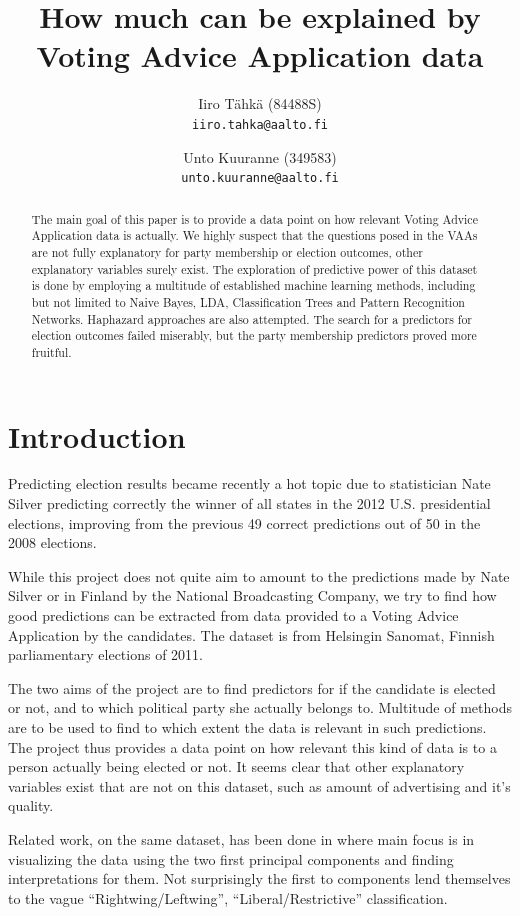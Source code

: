 \documentclass[a4paper,10pt]{article}
\title{How much can be explained by Voting Advice Application data}
\author{
        Iiro Tähkä (84488S)\\ 
       {\tt \small iiro.tahka@aalto.fi}
        \and          
        Unto Kuuranne (349583)\\ 
       {\tt \small unto.kuuranne@aalto.fi}
}
\begin{document}
\maketitle

\begin{abstract}
The main goal of this paper is to provide a data point on how relevant Voting Advice Application data is actually. We highly suspect that the questions posed in the VAAs are not fully explanatory for party membership or election outcomes, other explanatory variables surely exist. The exploration of predictive power of this dataset is done by employing a multitude of established machine learning methods, including but not limited to Naive Bayes, LDA, Classification Trees and Pattern Recognition Networks. Haphazard approaches are also attempted. The search for a predictors for election outcomes failed miserably, but the party membership predictors proved more fruitful.
\end{abstract}


\section{Introduction}
Predicting election results became recently a hot topic due to statistician Nate Silver predicting correctly the winner of all states in the 2012 U.S. presidential elections, improving from the previous 49 correct predictions out of 50 in the 2008 elections.

While this project does not quite aim to amount to the predictions made by Nate Silver or in Finland by the National Broadcasting Company, we try to find how good predictions can be extracted from data provided to a Voting Advice Application by the candidates. The dataset is from Helsingin Sanomat, Finnish parliamentary elections of 2011.

The two aims of the project are to find predictors for if the candidate is elected or not, and to which political party she actually belongs to. Multitude of methods are to be used to find to which extent the data is relevant in such predictions.
The project thus provides a data point on how relevant this kind of data is to a person actually being elected or not. It seems clear that other explanatory variables exist that are not on this dataset, such as amount of advertising and it’s quality.

Related work, on the same dataset, has been done \cite{Talonen:2011:APE:2075337.2075371} in where main focus is in visualizing the data using the two first principal components and finding interpretations for them. Not surprisingly the first to components lend themselves to the vague “Rightwing/Leftwing”, “Liberal/Restrictive” classification. 
\end{document}
